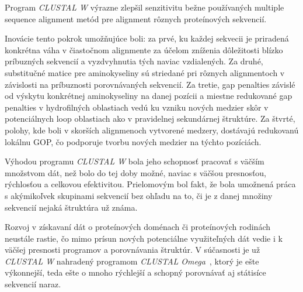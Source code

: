 \documentclass[nobib]{tufte-handout}
\begin{document}
Program \emph{CLUSTAL W} výrazne zlepšil senzitivitu bežne používaných multiple sequence alignment metód pre alignment rôznych proteínových sekvencií. 

Inovácie tento pokrok umožňujúce boli: za prvé, ku každej sekvecii je priradená konkrétna váha v čiastočnom alignmente za účelom zníženia dôležitosti blízko príbuzných sekvencií a vyzdvyhnutia tých naviac vzdialených. Za druhé, substitučné matice pre aminokyseliny sú striedané pri rôznych alignmentoch v závislosti na príbuznosti porovnávaných sekvencií. Za tretie, gap penalties závislé od výskytu konkrétnej aminokyseliny na danej pozícii a miestne redukované gap penalties v hydrofilných oblastiach vedú ku vzniku nových medzier skôr v potenciálnych loop oblastiach ako v pravidelnej sekundárnej štruktúre. Za štvrté, polohy, kde boli v skorších alignmenoch vytvorené medzery, dostávajú redukovanú lokálnu GOP, čo podporuje tvorbu nových medzier na týchto pozíciách.

Výhodou programu \emph{CLUSTAL W} bola jeho schopnosť pracovať s väčším množstvom dát, než bolo do tej doby možné, naviac s väčšou presnosťou, rýchlosťou a celkovou efektivitou. Prielomovým bol fakt, že bola umožnená práca s akýmikoľvek skupinami sekvencií bez ohľadu na to, či je z danej množiny sekvencií nejaká štruktúra už známa.

Rozvoj v získavaní dát o proteínových doménach či proteínových rodinách neustále rastie, čo mimo prísun nových potenciálne využiteľných dát vedie i k väčšej presnosti programov a porovnávania štruktúr. V súčasnosti je už \emph{CLUSTAL W} nahradený programom \emph{CLUSTAL Omega}~\citep{omega}, ktorý je ešte výkonnejší, teda ešte o mnoho rýchlejší a schopný porovnávať aj státisíce sekvencií naraz.



\end{document}
